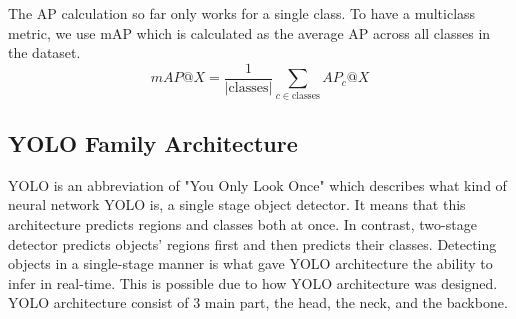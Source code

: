   The AP calculation so far only works for a single class. To have a multiclass metric, we use mAP
  which is calculated as the average AP across all classes in the dataset.
  \begin{equation}
    mAP@X = \frac{1}{|\text{classes}|} \sum_{c\in \text{classes}} AP_c@X
  \end{equation}



  \subsection{YOLO Family Architecture}
  YOLO is an abbreviation of "You Only Look Once" which describes what kind of neural network YOLO
  is, a single stage object detector. It means that this architecture predicts regions 
  and classes both at once. In contrast, two-stage detector predicts objects' regions first
  and then predicts their classes. Detecting objects in a single-stage manner is what gave YOLO
  architecture the ability to infer in real-time. This is possible due to how YOLO architecture
  was designed. YOLO architecture consist of 3 main part, the head, the neck, and the backbone.

   
